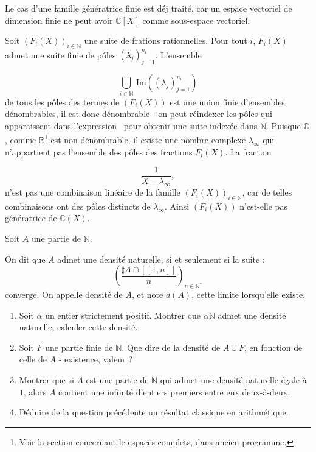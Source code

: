 \begin{sol}
Le cas d'une famille g\'en\'eratrice finie est d\'ej trait\'e, car un espace vectoriel de dimension finie ne peut avoir %
$\mathbb{C} [X]$ comme sous-espace vectoriel.

\par
Soit \((F_i(X))_{i\in\mathbb{N}}\) une suite de frations rationnelles. %
Pour tout \(i\), \(F_i(X)\) admet une suite finie de p\^oles \((\lambda_j)_{j=1}^{n_i}\). %
L'ensemble

\begin{equation}
\bigcup\limits_{i\in\mathbb{N}}\,\text{Im}((\lambda_j)_{j=1}^{n_i})
\label{eq:def_poles_ij}
\end{equation}
de tous les p\^oles des termes de \((F_i(X))\) est une union finie d'ensembles d\'enombrables, %
il est donc d\'enombrable - on peut r\'eindexer les p\^oles qui apparaissent dans l'expression~ %
pour obtenir une suite index\'ee dans \(\mathbb{N}\). %
Puisque \(\mathbb{C}\), comme \(\mathbb{R}\)\footnote{Voir la section concernant le espaces complets, dans ancien programme.}%
est non d\'enombrable, il existe une nombre complexe \(\lambda_{\infty}\) qui n'appartient pas  l'ensemble des p\^oles des fractions \(F_i(X)\). %
La fraction

\[\frac{1}{X-\lambda_{\infty}},\]
n'est pas une combinaison lin\'eaire de la famille \((F_i(X))_{i\in\mathbb{N}}\), %
car de telles combinaisons ont des p\^oles distincts de \(\lambda_{\infty}\). %
Ainsi \((F_i(X))\) n'est-elle pas g\'en\'eratrice de \(\mathbb{C}(X)\).
\end{sol}


\begin{exer}
Soit $A$ une partie de $\mathbb{N}$.

\par
On dit que $A$ admet une densité naturelle, si et seulement si la suite :
\[\left(\frac{\sharp A \cap [\![1,n]\!]}{n}\right)_{n \in \mathbb{N}^{\ast}}\]
converge. %
On appelle densité de $A$, et note $d(A)$, cette limite lorsqu'elle existe.
\begin{enumerate}
\item Soit $\alpha$ un entier strictement positif. Montrer que $\alpha \mathbb{N}$ admet une densité naturelle, %
calculer cette densité.
\item Soit \(F\) une partie finie de \(\mathbb{N}\). Que dire de la densit\'e de \(A\cup F\), en fonction de celle de \(A\) - existence, valeur ?
\item Montrer que si $A$ est une partie de $\mathbb{N}$ qui admet une densité naturelle égale à $1$, %
alors $A$ contient une infinité d'entiers premiers entre eux deux-à-deux.
\item Déduire de la question précédente un résultat classique en arithmétique.%
\end{enumerate}
\end{exer}

